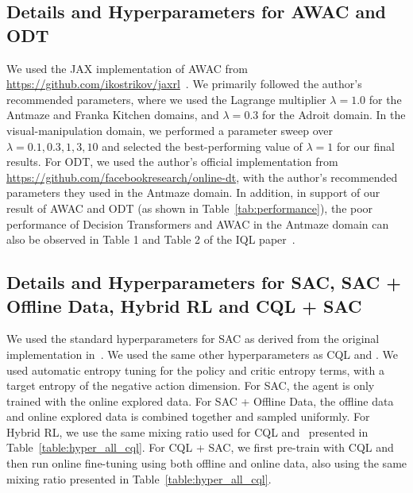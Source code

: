 \subsection{Details and Hyperparameters for AWAC and ODT}
We used the JAX implementation of AWAC from \url{https://github.com/ikostrikov/jaxrl}~\cite{jaxrl}. We primarily followed the author's recommended parameters, where we used the Lagrange multiplier $\lambda = 1.0$ for the Antmaze and Franka Kitchen domains, and $\lambda = 0.3$ for the Adroit domain. In the visual-manipulation domain, we performed a parameter sweep over $\lambda = 0.1, 0.3, 1, 3, 10$ and selected the best-performing value of $\lambda = 1$ for our final results. For ODT, we used the author's official implementation from \url{https://github.com/facebookresearch/online-dt}, with the author's recommended parameters they used in the Antmaze domain. In addition, in support of our result of AWAC and ODT (as shown in Table~\ref{tab:performance}), the poor performance of Decision Transformers and AWAC in the Antmaze domain can also be observed in Table 1 and Table 2 of the IQL paper~\citep{kostrikov2021offlineb}.

\subsection{Details and Hyperparameters for SAC, SAC + Offline Data, Hybrid RL and CQL + SAC}
We used the standard hyperparameters for SAC as derived from the original implementation in~\cite{sac}. We used the same other hyperparameters as CQL and \methodname. We used automatic entropy tuning for the policy and critic entropy terms, with a target entropy of the negative action dimension. For SAC, the agent is only trained with the online explored data. For SAC + Offline Data, the offline data and online explored data is combined together and sampled uniformly. For Hybrid RL, we use the same mixing ratio used for CQL and \methodname\ presented in Table~\ref{table:hyper_all_cql}. For CQL + SAC, we first pre-train with CQL and then run online fine-tuning using both offline and online data, also using the same mixing ratio presented in Table~\ref{table:hyper_all_cql}. 

